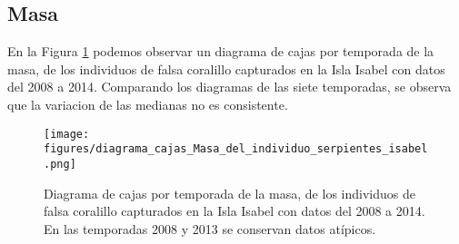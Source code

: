 \documentclass{article}
\begin{document}
\subsection*{Masa}
En la Figura \ref{fig:pngBoxsplotMasa} podemos observar un diagrama de cajas por temporada de la
masa, de los individuos de falsa coralillo capturados en la Isla Isabel con datos del 2008 a 2014.
Comparando los diagramas de las siete temporadas, se observa  que la variacion de las medianas no es
consistente.

\begin{figure}[H]
\centering
\label{fig:pngBoxsplotMasa}
\texttt{[image: figures/diagrama\_cajas\_Masa\_del\_individuo\_serpientes\_isabel.png]}
\caption{Diagrama de cajas por temporada de la masa, de los individuos de falsa coralillo capturados en la Isla Isabel con datos del 2008 a 2014. En las temporadas 2008 y 2013 se conservan datos atípicos.}
\end{figure}
\end{document}
